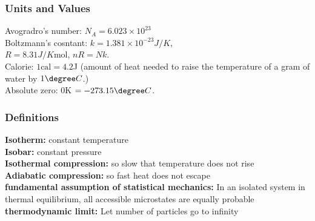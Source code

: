 \documentclass[a4paper, norsk, 8pt]{article}
\begin{document}
\tiny
\begin{multicols*}{3}
\subsubsection*{\scriptsize Units and Values}
Avogradro's number: $N_A=6.023\times 10^{23}$ \\
Boltzmann's cosntant: $k=1.381\times 10^{-23}J/K$,\\ $R = 8.31J/K\text{mol}$, $nR=Nk$.\\
Calorie: $1\text{cal} = 4.2$J (amount of heat needed to raise the temperature of a gram of water by $1\degree C$.)\\
Absolute zero: $0$K $=-273.15\degree C$.


\subsubsection*{\scriptsize Definitions}
\textbf{Isotherm:} constant temperature \\
\textbf{Isobar:} constant pressure \\
\textbf{Isothermal compression:} so slow that temperature does not rise \\
\textbf{Adiabatic compression:} so fast heat does not escape \\
\textbf{fundamental assumption of statistical mechanics:} In an isolated system in thermal equilibrium, all accessible microstates are equally probable\\
\textbf{thermodynamic limit:} Let number of particles go to infinity\\



\end{multicols*}
\end{document}
